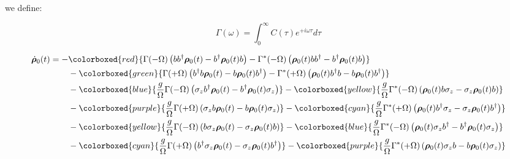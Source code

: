 \documentclass[%
preprint,
onecolumn,
notitlepag,
 amsmath,amssymb,
 aps,
 pra,
]{revtex4-2}
\begin{document}
 we define:
 
 \begin{equation}\Gamma(\omega)=\int_{0}^{\infty} C(\tau) e^{+i \omega \tau} d \tau\end{equation}
 
 \begin{equation}\begin{aligned}
\dot{\boldsymbol{\rho}}_0(t) =-&  \colorboxed{red}{ \Gamma(-\Omega)\left(b b^{\dagger} \boldsymbol{\rho}_{\mathrm{0}}(t)-b^{\dagger} \boldsymbol{\rho}_{\mathrm{0}}(t) b\right)-\Gamma^{*}(-\Omega)\left(\boldsymbol{\rho}_{\mathrm{0}}(t) b b^{\dagger}-b^{\dagger} \boldsymbol{\rho}_{\mathrm{0}}(t) b\right)  }  \\
&-  \colorboxed{green}{ \Gamma(+\Omega)\left(b^{\dagger} b \boldsymbol{\rho}_{\mathrm{0}}(t)-b \boldsymbol{\rho}_{\mathrm{0}}(t) b^{\dagger}\right)  -\Gamma^{*}(+\Omega)\left(\boldsymbol{\rho}_{\mathrm{0}}(t) b^{\dagger} b-b \boldsymbol{\rho}_{\mathrm{0}}(t) b^{\dagger}\right) }\\
&-  \colorboxed{blue}{ \frac{g}{\Omega}\Gamma(-\Omega)\left(\sigma_z b^{\dagger}  \boldsymbol{\rho}_{\mathrm{0}}(t)-b^{\dagger} \boldsymbol{\rho}_{\mathrm{0}}(t) \sigma_z \right) }  - \colorboxed{yellow}{ \frac{g}{\Omega} \Gamma^{*}(-\Omega)\left(\boldsymbol{\rho}_{\mathrm{0}}(t) b \sigma_z -\sigma_z  \boldsymbol{\rho}_{\mathrm{0}}(t) b\right) }\\
&- \colorboxed{purple}{ \frac{g}{\Omega}\Gamma(+\Omega)\left(\sigma_z b  \boldsymbol{\rho}_{\mathrm{0}}(t)-b \boldsymbol{\rho}_{\mathrm{0}}(t) \sigma_z \right) }  - \colorboxed{cyan}{ \frac{g}{\Omega} \Gamma^{*}(+\Omega)\left(\boldsymbol{\rho}_{\mathrm{0}}(t) b^{\dagger} \sigma_z -\sigma_z  \boldsymbol{\rho}_{\mathrm{0}}(t) b^{\dagger} \right) }\\
&- \colorboxed{yellow}{ \frac{g}{\Omega}\Gamma(-\Omega)\left(b  \sigma_z  \boldsymbol{\rho}_{\mathrm{0}}(t)-\sigma_z \boldsymbol{\rho}_{\mathrm{0}}(t) b \right) } - \colorboxed{blue}{ \frac{g}{\Omega} \Gamma^{*}(-\Omega)\left(\boldsymbol{\rho}_{\mathrm{0}}(t)  \sigma_z b^{\dagger} -b^{\dagger}  \boldsymbol{\rho}_{\mathrm{0}}(t) \sigma_z \right) }\\
&- \colorboxed{cyan}{ \frac{g}{\Omega}\Gamma(+\Omega)\left(b^{\dagger}  \sigma_z  \boldsymbol{\rho}_{\mathrm{0}}(t)-\sigma_z \boldsymbol{\rho}_{\mathrm{0}}(t) b^{\dagger} \right) } - \colorboxed{purple}{ \frac{g}{\Omega} \Gamma^{*}(+\Omega)\left(\boldsymbol{\rho}_{\mathrm{0}}(t)  \sigma_z b -b  \boldsymbol{\rho}_{\mathrm{0}}(t) \sigma_z \right)}\\

\end{aligned}
\end{equation}
\end{document}
